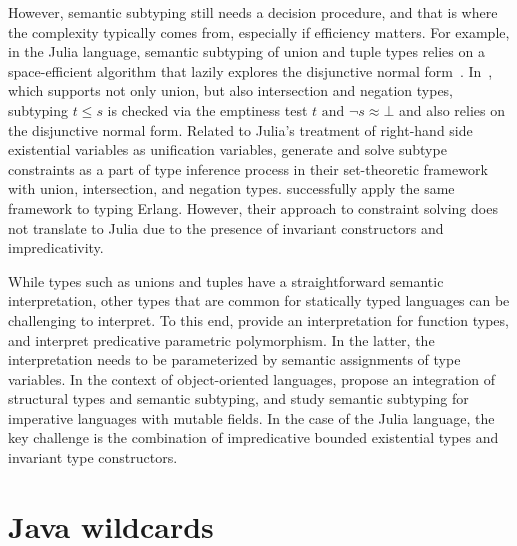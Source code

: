 However, semantic subtyping still needs a decision procedure, and that is where
the complexity typically comes from, especially if efficiency matters.
For example, in the Julia language, semantic subtyping of union and tuple types
relies on a space-efficient algorithm that lazily explores the disjunctive
normal form~\cite{bib:chung:julia-sub-algo:2019}.
In~\cite{bib:frisch:sem-sub:2002}, which supports not only union, but also
intersection and negation types, subtyping $t \leq s$ is checked via
the emptiness test $t \text{ and } \lnot s \approx \bot$ and also relies on
the disjunctive normal form.
Related to Julia's treatment of right-hand side existential variables as 
unification variables, \citet{bib:castagna:sem-poly-inf:2015} generate and solve
subtype constraints as a part of type inference process in their set-theoretic
framework with union, intersection, and negation types.
\citet{bib:schimpf:set-types-erlang:2023} successfully apply the
same framework to typing Erlang.
However, their approach to constraint solving does not translate to Julia
due to the presence of invariant constructors and impredicativity.

While types such as unions and tuples have a straightforward
semantic interpretation, other types that are common for statically typed
languages can be challenging to interpret.
To this end, \citet{bib:frisch:sem-sub:2002} provide an interpretation for
function types, and \citet{bib:castagna:sem-poly:2011} interpret predicative
parametric polymorphism. In the latter, the interpretation needs to be
parameterized by semantic assignments of type variables.
In the context of object-oriented languages,
\citet{bib:dardha:sem-sub-obj:2016} propose an integration of structural types and
semantic subtyping, and \citet{bib:ancona:sem-sub-imp:2016} study semantic
subtyping for imperative languages with mutable fields.
In the case of the Julia language, %
the key challenge is the combination of
impredicative bounded existential types and invariant type constructors.

\section{Java wildcards}

